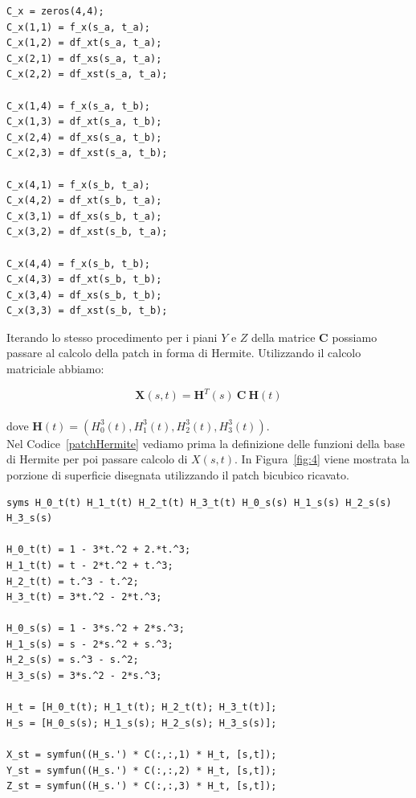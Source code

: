 \documentclass[12pt]{article}
\begin{document}
\begin{lstlisting}[caption={Definizione del piano $X$ della matrice C}, style=matlab, label={matriceCX}, captionpos=b]
C_x = zeros(4,4);
C_x(1,1) = f_x(s_a, t_a);
C_x(1,2) = df_xt(s_a, t_a);
C_x(2,1) = df_xs(s_a, t_a);
C_x(2,2) = df_xst(s_a, t_a);

C_x(1,4) = f_x(s_a, t_b);
C_x(1,3) = df_xt(s_a, t_b);
C_x(2,4) = df_xs(s_a, t_b);
C_x(2,3) = df_xst(s_a, t_b);

C_x(4,1) = f_x(s_b, t_a);
C_x(4,2) = df_xt(s_b, t_a);
C_x(3,1) = df_xs(s_b, t_a);
C_x(3,2) = df_xst(s_b, t_a);

C_x(4,4) = f_x(s_b, t_b);
C_x(4,3) = df_xt(s_b, t_b);
C_x(3,4) = df_xs(s_b, t_b);
C_x(3,3) = df_xst(s_b, t_b);
\end{lstlisting}
Iterando lo stesso procedimento per i piani $Y$ e $Z$ della matrice $\mathbf{C}$ possiamo passare al calcolo della patch
in forma di Hermite.
Utilizzando il calcolo matriciale abbiamo:

$$\mathbf{X}(s,t) = \mathbf{H}^T(s)\mathbf{\ C\ H}(t)$$\\
dove $\mathbf{H}(t) = (H^3_0(t), H^3_1(t), H^3_2(t), H^3_3(t))$.\\
Nel Codice~\ref{patchHermite} vediamo prima la definizione delle funzioni della base di
Hermite per poi passare calcolo di $X(s,t)$. In Figura~\ref{fig:4} viene mostrata la porzione
di superficie disegnata utilizzando il patch bicubico ricavato.
\begin{lstlisting}[caption={Patch in forma di Hermite}, style=matlab, label={patchHermite}, captionpos=b]
syms H_0_t(t) H_1_t(t) H_2_t(t) H_3_t(t) H_0_s(s) H_1_s(s) H_2_s(s) H_3_s(s)

H_0_t(t) = 1 - 3*t.^2 + 2.*t.^3;
H_1_t(t) = t - 2*t.^2 + t.^3;
H_2_t(t) = t.^3 - t.^2;
H_3_t(t) = 3*t.^2 - 2*t.^3;

H_0_s(s) = 1 - 3*s.^2 + 2*s.^3;
H_1_s(s) = s - 2*s.^2 + s.^3;
H_2_s(s) = s.^3 - s.^2;
H_3_s(s) = 3*s.^2 - 2*s.^3;

H_t = [H_0_t(t); H_1_t(t); H_2_t(t); H_3_t(t)];
H_s = [H_0_s(s); H_1_s(s); H_2_s(s); H_3_s(s)];

X_st = symfun((H_s.') * C(:,:,1) * H_t, [s,t]);
Y_st = symfun((H_s.') * C(:,:,2) * H_t, [s,t]);
Z_st = symfun((H_s.') * C(:,:,3) * H_t, [s,t]);
\end{lstlisting}
\end{document}
